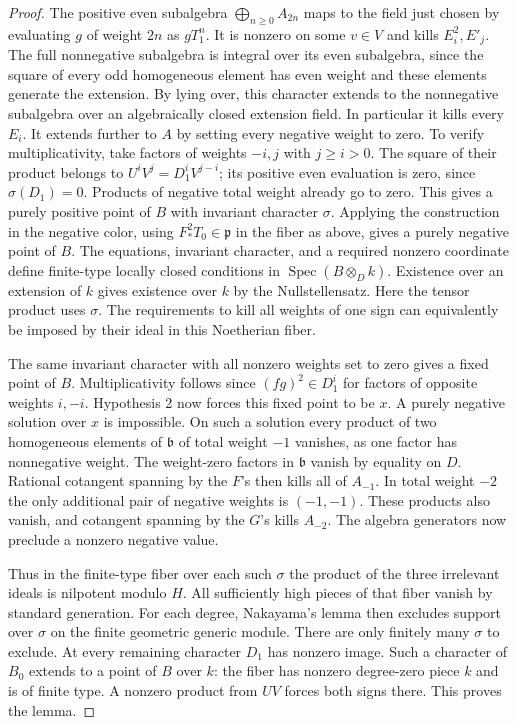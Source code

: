 \documentclass[a4paper,11pt]{article}
\theoremstyle{definition}
\theoremstyle{remark}
\numberwithin{equation}{section}
\begin{document}
\begin{proof}
The positive even subalgebra \(\bigoplus_{n\ge0} A_{2n}\) maps to the field just chosen by evaluating \(g\) of weight \(2n\) as \(gT_1^n\). It is nonzero on some \(v\in V\) and kills \(E_i^2,E'_j\). The full nonnegative subalgebra is integral over its even subalgebra, since the square of every odd homogeneous element has even weight and these elements generate the extension. By lying over, this character extends to the nonnegative subalgebra over an algebraically closed extension field. In particular it kills every \(E_i\). It extends further to \(A\) by setting every negative weight to zero. To verify multiplicativity, take factors of weights \(-i,j\) with \(j\ge i>0\). The square of their product belongs to \(U^iV^j=D_1^i V^{j-i}\); its positive even evaluation is zero, since \(\sigma(D_1)=0\). Products of negative total weight already go to zero. This gives a purely positive point of \(B\) with invariant character \(\sigma\). Applying the construction in the negative color, using \(F_*^2T_0\in\mathfrak p\) in the fiber as above, gives a purely negative point of \(B\). The equations, invariant character, and a required nonzero coordinate define finite-type locally closed conditions in \(\operatorname{Spec}(B\otimes_D k)\). Existence over an extension of \(k\) gives existence over \(k\) by the Nullstellensatz. Here the tensor product uses \(\sigma\). The requirements to kill all weights of one sign can equivalently be imposed by their ideal in this Noetherian fiber.

The same invariant character with all nonzero weights set to zero gives a fixed point of \(B\). Multiplicativity follows since \((fg)^2\in D_1^i\) for factors of opposite weights \(i,-i\). Hypothesis 2 now forces this fixed point to be \(x\). A purely negative solution over \(x\) is impossible. On such a solution every product of two homogeneous elements of \(\mathfrak b\) of total weight \(-1\) vanishes, as one factor has nonnegative weight. The weight-zero factors in \(\mathfrak b\) vanish by equality on \(D\). Rational cotangent spanning by the \(F\)'s then kills all of \(A_{-1}\). In total weight \(-2\) the only additional pair of negative weights is \((-1,-1)\). These products also vanish, and cotangent spanning by the \(G\)'s kills \(A_{-2}\). The algebra generators now preclude a nonzero negative value.

Thus in the finite-type fiber over each such \(\sigma\) the product of the three irrelevant ideals is nilpotent modulo \(H\). All sufficiently high pieces of that fiber vanish by standard generation. For each degree, Nakayama's lemma then excludes support over \(\sigma\) on the finite geometric generic module. There are only finitely many \(\sigma\) to exclude. At every remaining character \(D_1\) has nonzero image. Such a character of \(B_0\) extends to a point of \(B\) over \(k\): the fiber has nonzero degree-zero piece \(k\) and is of finite type. A nonzero product from \(UV\) forces both signs there. This proves the lemma.
\end{proof}
\end{document}
